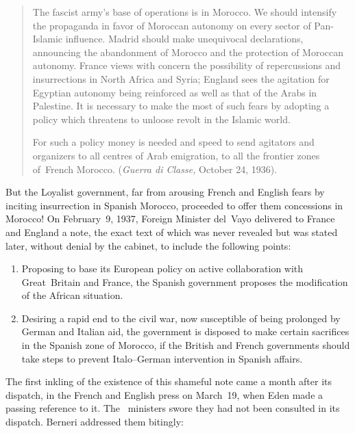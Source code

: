 \begin{quotation}
  The fascist army’s base of operations is in Morocco. We should intensify the propaganda in favor of Moroccan autonomy on every sector of Pan-Islamic influence. Madrid should make unequivocal declarations, announcing the abandonment of Morocco and the protection of Moroccan autonomy. France views with concern the possibility of repercussions and insurrections in North Africa and Syria; England sees the agitation for Egyptian autonomy being reinforced as well as that of the Arabs in Palestine. It is necessary to make the most of such fears by adopting a policy which threatens to unloose revolt in the Islamic world.
  
  For such a policy money is needed and speed to send agitators and organizers to all centres of Arab emigration, to all the frontier zones of~French Morocco. (\emph{Guerra di Classe,} October 24, 1936).
\end{quotation}

But the Loyalist government, far from arousing French and English fears by inciting insurrection in Spanish Morocco, proceeded to offer them concessions in Morocco! On February~9, 1937, Foreign Minister del~Vayo delivered to France and England a note, the exact text of which was never revealed but was stated later, without denial by the cabinet, to include the following points:

\begin{enumerate}
  \item Proposing to base its European policy on active collaboration with Great~Britain and France, the Spanish government proposes the modification of the African situation.
  
  \item Desiring a rapid end to the civil war, now susceptible of being prolonged by German and Italian aid, the government is disposed to make certain sacrifices in the Spanish zone of Morocco, if the British and French governments should take steps to prevent Italo--German intervention in Spanish affairs.
\end{enumerate}

The first inkling of the existence of this shameful note came a month after its dispatch, in the French and English press on March~19, when Eden made a passing reference to it. The \CNT\ ministers swore they had not been consulted in its dispatch. Berneri addressed them bitingly:

